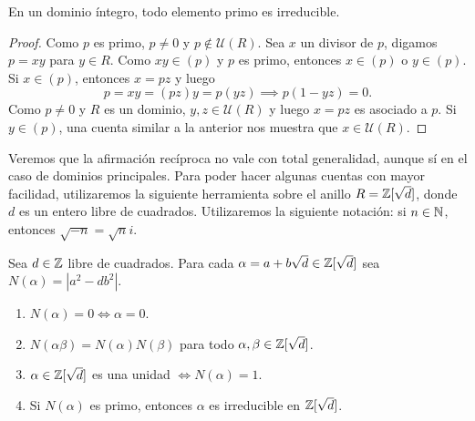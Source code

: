 \begin{proposition}
En un dominio íntegro, todo elemento primo es irreducible.  
\end{proposition}

\begin{proof}
Como $p$ es primo, $p\ne 0$ y $p\not\in\mathcal{U}(R)$. Sea $x$ un divisor de $p$, digamos $p=xy$ para $y\in R$. Como $xy\in(p)$ y $p$ es primo,
entonces $x\in(p)$ o $y\in(p)$. Si $x\in(p)$, entonces $x=pz$ y luego 
\[
p=xy=(pz)y=p(yz)\implies p(1-yz)=0.
\]
Como $p\ne 0$ y $R$ es un dominio, $y,z\in\mathcal{U}(R)$ y luego $x=pz$ es asociado a $p$. Si $y\in(p)$, una cuenta similar a la anterior nos muestra
que $x\in\mathcal{U}(R)$.
\end{proof}

Veremos que la afirmación recíproca no vale con total generalidad, aunque sí en el caso de dominios principales. Para poder hacer algunas
cuentas con mayor facilidad, utilizaremos la siguiente herramienta sobre el anillo $R=\mathbb{Z}[\sqrt{d}]$, donde $d$ es un entero 
libre de cuadrados. Utilizaremos la siguiente notación: si $n\in\mathbb{N}$, entonces $\sqrt{-n}=\sqrt{n}i$. 

\begin{lemma}
Sea $d\in\mathbb{Z}$ libre de cuadrados. Para cada $\alpha=a+b\sqrt{d}\in\mathbb{Z}[\sqrt{d}]$ 
sea $N(\alpha)=|a^2-db^2|$. 
\begin{enumerate}
\item $N(\alpha)=0\Longleftrightarrow \alpha=0$.
\item $N(\alpha\beta)=N(\alpha)N(\beta)$ para todo $\alpha,\beta\in\mathbb{Z}[\sqrt{d}]$. 
\item $\alpha\in\mathbb{Z}[\sqrt{d}]$ es una unidad $\Longleftrightarrow N(\alpha)=1$.
\item Si $N(\alpha)$ es primo, entonces $\alpha$ es irreducible en $\mathbb{Z}[\sqrt{d}]$.  	
\end{enumerate}
\end{lemma}

